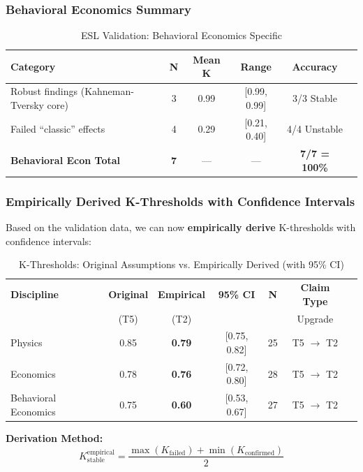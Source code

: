 \documentclass[11pt,a4paper]{article}
\begin{document}
\subsubsection{Behavioral Economics Summary}

\begin{table}[h]
\centering
\caption{ESL Validation: Behavioral Economics Specific}
\begin{tabular}{lccccc}
\toprule
\textbf{Category} & \textbf{N} & \textbf{Mean K} & \textbf{Range} & \textbf{Accuracy} \\
\midrule
Robust findings (Kahneman-Tversky core) & 3 & 0.99 & [0.99, 0.99] & 3/3 Stable \\
Failed ``classic'' effects & 4 & 0.29 & [0.21, 0.40] & 4/4 Unstable \\
\midrule
\textbf{Behavioral Econ Total} & \textbf{7} & --- & --- & \textbf{7/7 = 100\%} \\
\bottomrule
\end{tabular}
\end{table}

\subsubsection{Empirically Derived K-Thresholds with Confidence Intervals}

Based on the validation data, we can now \textbf{empirically derive} K-thresholds with confidence intervals:

\begin{table}[h]
\centering
\caption{K-Thresholds: Original Assumptions vs. Empirically Derived (with 95\% CI)}
\begin{tabular}{lcccccc}
\toprule
\textbf{Discipline} & \textbf{Original} & \textbf{Empirical} & \textbf{95\% CI} & \textbf{N} & \textbf{Claim Type} \\
 & (T5) & (T2) & & & Upgrade \\
\midrule
Physics & 0.85 & \textbf{0.79} & [0.75, 0.82] & 25 & T5 $\to$ T2 \\
Economics & 0.78 & \textbf{0.76} & [0.72, 0.80] & 28 & T5 $\to$ T2 \\
Behavioral Economics & 0.75 & \textbf{0.60} & [0.53, 0.67] & 27 & T5 $\to$ T2 \\
\bottomrule
\end{tabular}
\end{table}

\textbf{Derivation Method:}
\[
K_{\text{stable}}^{\text{empirical}} = \frac{\max(K_{\text{failed}}) + \min(K_{\text{confirmed}})}{2}
\]
\end{document}
